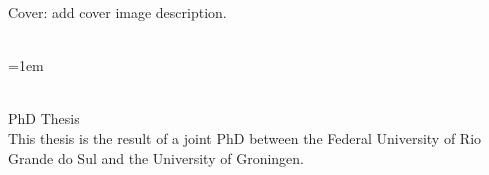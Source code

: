 \thispagestyle{empty}

\hyphenation{}

\null
\vfill

\noindent Cover: add cover image description.
\vspace{1.5cm}

\noindent\myTitle\\
\hangindent=1em

\noindent \myName\\
PhD Thesis\\

\vspace{1.5cm}
\noindent This thesis is the result of a joint PhD between the Federal University of Rio Grande do Sul and the University of Groningen. \\

\vspace{1.5cm}


